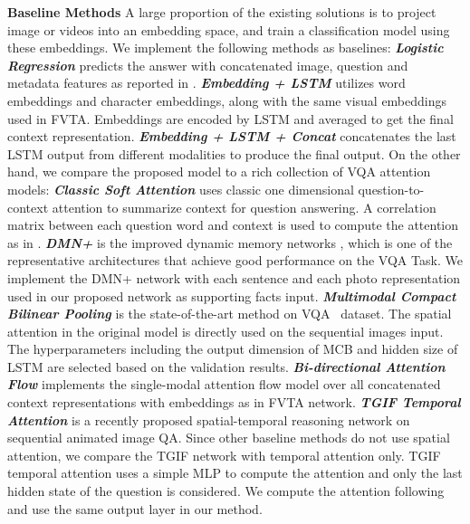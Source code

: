 \noindent\textbf{Baseline Methods} A large proportion of the existing solutions is to project image or videos into an embedding space, and train a classification model using these embeddings. We implement the following methods as baselines: \textbf{\textit{Logistic Regression}} predicts the answer with concatenated image, question and metadata features as reported in \cite{jiang2017memexqa}. \textbf{\textit{Embedding + LSTM}} utilizes word embeddings and character embeddings, along with the same visual embeddings used in FVTA. Embeddings are encoded by LSTM and averaged to get the final context representation. \textbf{\textit{Embedding + LSTM + Concat}} concatenates the last LSTM output from different modalities to produce the final output. On the other hand, we compare the proposed model to a rich collection of VQA attention models: \textbf{\textit{Classic Soft Attention}} uses classic one dimensional question-to-context attention to summarize context for question answering. A correlation matrix between each question word and context is used to compute the attention as in \cite{seo2016bidirectional,xu2016ask}. \textbf{\textit{DMN+}} is the improved dynamic memory networks \cite{xiong2016dynamic}, which is one of the representative architectures that achieve good performance on the VQA Task. We implement the DMN+ network with each sentence and each photo representation used in our proposed network as supporting facts input. \textbf{\textit{Multimodal Compact Bilinear Pooling}}\cite{fukui2016multimodal} is the state-of-the-art method on VQA~\cite{antol2015vqa} dataset. The spatial attention in the original model is directly used on the sequential images input. The hyperparameters including the output dimension of MCB and hidden size of LSTM are selected based on the validation results. 
\textbf{\textit{Bi-directional Attention Flow}} implements the single-modal attention flow model \cite{seo2016bidirectional} over all concatenated context representations with embeddings as in FVTA network. \textbf{\textit{TGIF Temporal Attention}} \cite{jang2017tgif} is a recently proposed spatial-temporal reasoning network on sequential animated image QA. Since other baseline methods do not use spatial attention, we compare the TGIF network with temporal attention only. TGIF temporal attention uses a simple MLP to compute the attention and only the last hidden state of the question is considered. We compute the attention following \cite{jang2017tgif} and use the same output layer in our method.





